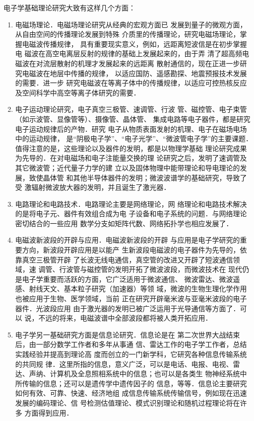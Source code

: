 电子学基础理论研究大致有这样几个方面：
\begin{enumerate}

\item 电磁场理论．电磁场理论研究从经典的宏观方面已
发展到量子的微观方面，从自由空间的传播理论发展到特殊
介质里的传播理论，研究电磁场理论，掌握电磁波传播规律，
具有重要现实意义，例如，远距离短波信是在初步掌握电
磁波在高空电离层反射的规律的基础上发展起来的，由于弄
清了超高频电磁波在对流层散射的机理才发展起来的远距离
散射通信的，现在正进一步研究电磁波在地层中传播的规律，
以适应国防、遥感勘探、地震预报技术发展的需要．进一步
研究电磁波在等离子体中的传播规律，以适应可控热核反应
及空间科学中高空等离子体研究的需要．
\item 电子运动理论研究，电子真空三极管、速调管、行波
管、磁控管、电子束管（如示波管、显像管等）、摄像管、晶体管、
集成电路等电子器件，都是研究电子运动规律后的产物．研究
电子从物质表面发射的机理、电子在磁场电场中的运动规律，
是“阴极电子学”、“电子光学”、“微波管电子学”的主要课题．
值得注意的是，这些理论以及器件的发明，都是以物理学基础
理论研究成果为先导的．在对电磁场和电子注能量交换的理
论研究之后，发明了速调管及其它微波管；近代量子力学的建
立以及固体物理中能带理论和导电理论的发展，致使晶体管
和其他半导体器件的发明；微波波谱学的基础研究，导致了受
激辐射微波放大器的发明，并且诞生了激光器．
\item 电路理论和电路技术．电路理论主要是网络理论，网
络理论和电路技术解决的是将电子元、器件有效组合成为电
子设备和电子系统的问题．与网络理论密切结合的一些应用
数学分支如矩阵代数、网络拓扑学也相应发展了．
\item 电磁波新波段的开辟与应用．电磁波新波段的开辟
与应用是电子学研究的重要方向，新波段开辟应用是以能产
生新波段电磁波的电子器件为先导的，依靠真空三极管开辟
了长波无线电通信，真空管的改进又开辟了短波通信领域，速
调管、行波管与磁控管的发明开拓了微波波段，而微波技术在
现代仍是电子学重要而活跃的方面，它广泛适用于微波通信、
微波雷达、微波遥感、射线天文、基本粒子研究（加速器）等领
域，微波的生物生理化学作用也被应用于生物、医学领域，当前
正在研究开辟毫米波与亚毫米波段的电子器件．光波段应用
由于激光器的发明已被广泛运用于光导通信等方面了．可以
说，不远的将来，电磁波谱中全部波段都将被人类开拓应用．
\item 电子学另一基础研究方面是信息论研究．信息论是在
第二次世界大战结束后，由一部分数学工作者和多年从事通
信、雷达工作的电子学工作者，总结实践经验并提高到理论高
度而创立的一门新学科，它研究各种信息传输系统的共同规
律．这里所指的信息，意义广泛，可以是电话、电报、电视、雷
达、声纳、计算机及全息照相系统中的信息；也可以是各类生
物神经系统中所传输的信息；还可以是遗传学中遗传因子的
信息，等等．信息论主要研究如何有效、可靠、快速、经济地组
成信息传输系统传输信号，例如现在迅速发展的编码理论、信
号检测估值理论、模式识别理论和随机过程理论将在许多
方面得到应用．

\end{enumerate}

